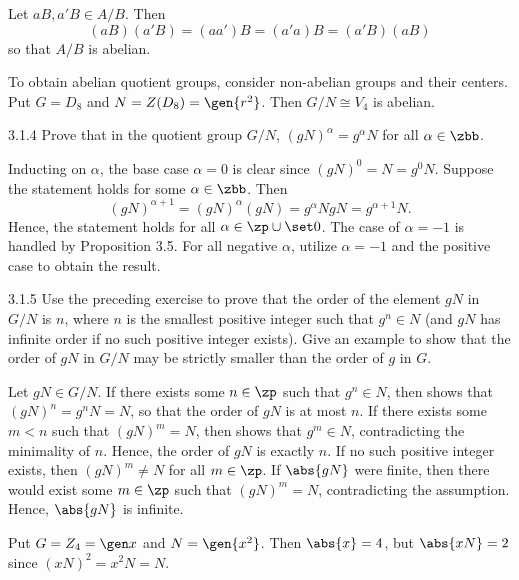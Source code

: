 \begin{sol}
    Let $aB, a'B \in A/B$.
	Then
    \[
    	(aB)(a'B) = (aa')B = (a'a)B = (a'B)(aB)
    \]
    so that $A/B$ is abelian.

    To obtain abelian quotient groups, consider non-abelian groups and their centers.
	Put $G = D_8$ and $N = Z(D_8) = \gen{r^2}$.
	Then $G/N \cong V_4$ is abelian.
\end{sol}

\begin{exercise}{3.1.4}
    Prove that in the quotient group $G/N$, $(gN)^{\alpha} = g^{\alpha}N$ for all $\alpha \in \zbb$.
\end{exercise}

\begin{sol}
    Inducting on $\alpha$, the base case $\alpha = 0$ is clear since $(gN)^0 = N = g^0N$.
	Suppose the statement holds for some $\alpha \in \zbb$.
	Then
    \[
    	(gN)^{\alpha + 1} = (gN)^{\alpha}(gN) = g^{\alpha}N gN = g^{\alpha + 1}N.
    \]
    Hence, the statement holds for all $\alpha \in \zp \cup \set 0$.
	The case of $\alpha = -1$ is handled by Proposition 3.5.
	For all negative $\alpha$, utilize $\alpha = -1$ and the positive case to obtain the result.
\end{sol}

\begin{exercise}{3.1.5}
    Use the preceding exercise to prove that the order of the element $gN$ in $G/N$ is $n$, where $n$ is the smallest positive integer such that $g^n \in N$ (and $gN$ has infinite order if no such positive integer exists).
	Give an example to show that the order of $gN$ in $G/N$ may be strictly smaller than the order of $g$ in $G$.
\end{exercise}

\begin{sol}
    Let $gN \in G/N$.
	If there exists some $n \in \zp$ such that $g^n \in N$, then  shows that $(gN)^n = g^nN = N$, so that the order of $gN$ is at most $n$.
	If there exists some $m < n$ such that $(gN)^m = N$, then  shows that $g^m \in N$, contradicting the minimality of $n$.
	Hence, the order of $gN$ is exactly $n$.
	If no such positive integer exists, then $(gN)^m \neq N$ for all $m \in \zp$.
	If $\abs{gN}$ were finite, then there would exist some $m \in \zp$ such that $(gN)^m = N$, contradicting the assumption.
	Hence, $\abs{gN}$ is infinite.

    Put $G = Z_4 = \gen x$ and $N = \gen{x^2}$.
	Then $\abs{x} = 4$, but $\abs{xN} = 2$ since $(xN)^2 = x^2N = N$.
\end{sol}

